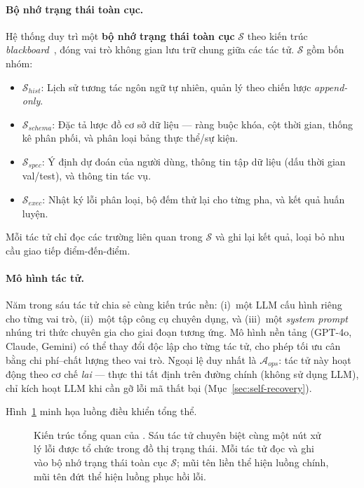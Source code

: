 \paragraph{Bộ nhớ trạng thái toàn cục.}
Hệ thống duy trì một \textbf{bộ nhớ trạng thái toàn cục} $\mathcal{S}$ theo kiến trúc \textit{blackboard}~\cite{hayes1985blackboard}, đóng vai trò không gian lưu trữ chung giữa các tác tử. $\mathcal{S}$ gồm bốn nhóm:

\begin{itemize}
    \item $\mathcal{S}_{hist}$: Lịch sử tương tác ngôn ngữ tự nhiên, quản lý theo chiến lược \textit{append-only}.
    \item $\mathcal{S}_{schema}$: Đặc tả lược đồ cơ sở dữ liệu --- ràng buộc khóa, cột thời gian, thống kê phân phối, và phân loại bảng thực thể/sự kiện.
    \item $\mathcal{S}_{spec}$: Ý định dự đoán của người dùng, thông tin tập dữ liệu (dấu thời gian val/test), và thông tin tác vụ.
    \item $\mathcal{S}_{exec}$: Nhật ký lỗi phân loại, bộ đếm thử lại cho từng pha, và kết quả huấn luyện.
\end{itemize}

Mỗi tác tử chỉ đọc các trường liên quan trong $\mathcal{S}$ và ghi lại kết quả, loại bỏ nhu cầu giao tiếp điểm-đến-điểm.

\paragraph{Mô hình tác tử.}
Năm trong sáu tác tử chia sẻ cùng kiến trúc nền: (i)~một LLM cấu hình riêng cho từng vai trò, (ii)~một tập công cụ chuyên dụng, và (iii)~một \textit{system prompt} nhúng tri thức chuyên gia cho giai đoạn tương ứng. Mô hình nền tảng (GPT-4o, Claude, Gemini) có thể thay đổi độc lập cho từng tác tử, cho phép tối ưu cân bằng chi phí--chất lượng theo vai trò. Ngoại lệ duy nhất là $\mathcal{A}_{ops}$: tác tử này hoạt động theo cơ chế \textit{lai} --- thực thi tất định trên đường chính (không sử dụng LLM), chỉ kích hoạt LLM khi cần gỡ lỗi mã thất bại (Mục~\ref{sec:self-recovery}).

Hình~\ref{fig:architecture} minh họa luồng điều khiển tổng thể.

\begin{figure}[htbp]
    \centering
    \caption{Kiến trúc tổng quan của \tool. Sáu tác tử chuyên biệt cùng một nút xử lý lỗi được tổ chức trong đồ thị trạng thái. Mỗi tác tử đọc và ghi vào bộ nhớ trạng thái toàn cục $\mathcal{S}$; mũi tên liền thể hiện luồng chính, mũi tên đứt thể hiện luồng phục hồi lỗi.}
    \label{fig:architecture}
\end{figure}
